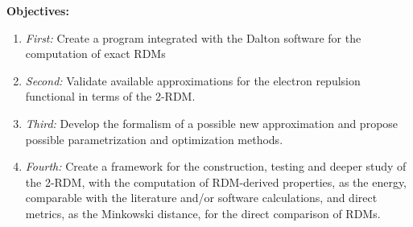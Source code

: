 \vspace{0.3cm}
\textbf{Objectives:}
\begin{enumerate}[label={}]
    \item \textit{First:} Create a program integrated with the Dalton software for the computation
        of exact RDMs
    \item \textit{Second:} Validate available approximations for the electron repulsion functional
        in terms of the 2-RDM.
    \item \textit{Third:} Develop the formalism of a possible new approximation and propose possible
        parametrization and optimization methods.
    \item \textit{Fourth:} Create a framework for the construction, testing and deeper study of
        the 2-RDM, with the computation of RDM-derived properties, as the energy,
        comparable with the literature and/or software calculations, and
        direct metrics, as the Minkowski distance, for the direct comparison
        of RDMs.
\end{enumerate}
